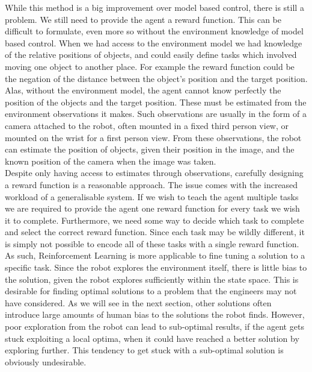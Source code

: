 While this method is a big improvement over model based control, there is still a problem. We still need to provide the agent a reward function. This can be difficult to formulate, even more so without the environment knowledge of model based control. When we had access to the environment model we had knowledge of the relative positions of objects, and could easily define tasks which involved moving one object to another place. For example the reward function could be the negation of the distance between the object's position and the target position. Alas, without the environment model, the agent cannot know perfectly the position of the objects and the target position. These must be estimated from the environment observations it makes. Such observations are usually in the form of a camera attached to the robot, often mounted in a fixed third person view, or mounted on the wrist for a first person view. From these observations, the robot can estimate the position of objects, given their position in the image, and the known position of the camera when the image was taken.\\

Despite only having access to estimates through observations, carefully designing a reward function is a reasonable approach. The issue comes with the increased workload of a generalisable system. If we wish to teach the agent multiple tasks we are required to provide the agent one reward function for every task we wish it to complete. Furthermore, we need some way to decide which task to complete and select the correct reward function. Since each task may be wildly different, it is simply not possible to encode all of these tasks with a single reward function. As such, Reinforcement Learning is more applicable to fine tuning a solution to a specific task. Since the robot explores the environment itself, there is little bias to the solution, given the robot explores sufficiently within the state space. This is desirable for finding optimal solutions to a problem that the engineers may not have considered. As we will see in the next section, other solutions often introduce large amounts of human bias to the solutions the robot finds. However, poor exploration from the robot can lead to sub-optimal results, if the agent gets stuck exploiting a local optima, when it could have reached a better solution by exploring further. This tendency to get stuck with a sub-optimal solution is obviously undesirable. \\

